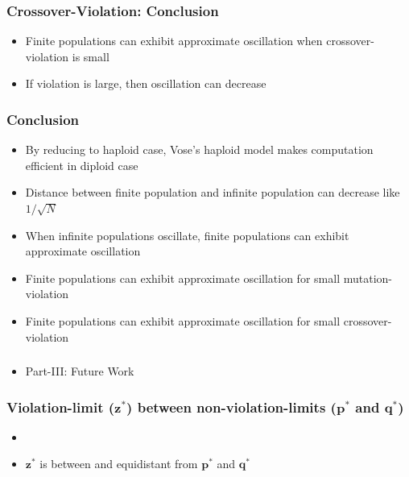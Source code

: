 \documentclass[aspectratio=169]{beamer}
\begin{document}
  \begin{frame}
    \frametitle{Crossover-Violation: Conclusion}
    \begin{itemize}
      \setlength\itemsep{1em}
      \item{Finite populations can exhibit approximate oscillation when crossover-violation is small} 
      \item{If violation is large, then oscillation can decrease}     
      
    \end{itemize}
  \end{frame}
  
  \begin{frame}
    \frametitle{Conclusion}
    \begin{itemize}
      \setlength\itemsep{1em}
      \item{By reducing to haploid case, Vose's haploid model makes computation efficient in diploid case} 
      \item{Distance between finite population and infinite population can decrease like $1/\sqrt{N}$}
      \item{When infinite populations oscillate, finite populations can exhibit approximate oscillation}
      \item{Finite populations can exhibit approximate oscillation for small mutation-violation}
      \item{Finite populations can exhibit approximate oscillation for small crossover-violation}      
    \end{itemize}
  \end{frame}
  
  \begin{frame}
    \frametitle{}
    \begin{itemize}
     \item Part-III: Future Work
    \end{itemize}
  \end{frame}
  
  \begin{frame}
    \frametitle{Violation-limit ($\bm{z}^\ast$) between non-violation-limits ($\bm{p}^\ast$ and $\bm{q}^\ast$)}
    \begin{itemize}
      \item 
      \centering
      \item $\bm{z}^\ast$ is between and equidistant from $\bm{p}^\ast$ and $\bm{q}^\ast$
    \end{itemize}
  \end{frame}
  
\end{document}
